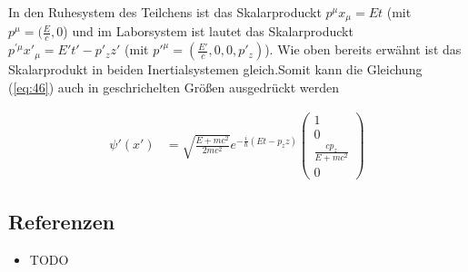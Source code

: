 In den Ruhesystem des Teilchens ist das Skalarproduckt \(p^{\mu}x_{\mu}=Et\) (mit \(p^{\mu} = (\frac{E}{c},0\)) und im Laborsystem ist lautet das Skalarproduckt \(p^{'\mu}x'_{\mu}=E't'-p'_zz'\) (mit \(p'^{\mu}=(\frac{E'}{c},0,0,p'_z)\)). Wie oben bereits erwähnt ist das Skalarprodukt in beiden Inertialsystemen gleich.Somit kann die Gleichung (\ref{eq:46}) auch in geschrichelten Größen ausgedrückt werden

\begin{align}
  \label{eq:47}
  \psi'(x') &=\sqrt{\frac{E + mc^2}{2mc^2}}e^{-\frac{i}{\hbar}(Et-p_z z) }
   \begin{pmatrix}
      1\\0\\\frac{cp_z}{E+mc^2}\\0
    \end{pmatrix}
\end{align}


\subsection*{Referenzen}
\begin{itemize}
\item TODO
\end{itemize}
  

